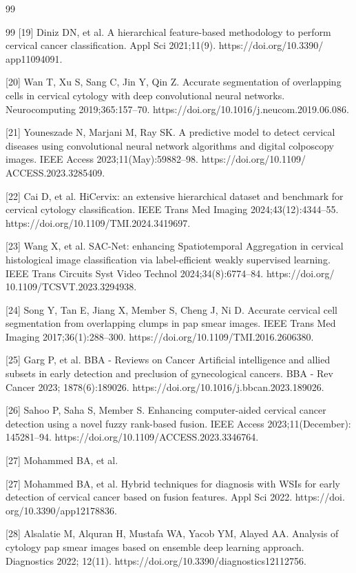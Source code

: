 \documentclass{svjour3}
\begin{document}
\begin{thebibliography}{99}
\begin{thebibliography}{99}
 [19] Diniz DN, et al. A hierarchical feature-based methodology to perform cervical cancer classification. Appl Sci 2021;11(9). https://doi.org/10.3390/ app11094091.

 [20] Wan T, Xu S, Sang C, Jin Y, Qin Z. Accurate segmentation of overlapping cells in cervical cytology with deep convolutional neural networks. Neurocomputing 2019;365:157–70. https://doi.org/10.1016/j.neucom.2019.06.086.

 [21] Youneszade N, Marjani M, Ray SK. A predictive model to detect cervical diseases using convolutional neural network algorithms and digital colposcopy images. IEEE Access 2023;11(May):59882–98. https://doi.org/10.1109/ ACCESS.2023.3285409.

 [22] Cai D, et al. HiCervix: an extensive hierarchical dataset and benchmark for cervical cytology classification. IEEE Trans Med Imaging 2024;43(12):4344–55. https://doi.org/10.1109/TMI.2024.3419697.

 [23] Wang X, et al. SAC-Net: enhancing Spatiotemporal Aggregation in cervical histological image classification via label-efficient weakly supervised learning. IEEE Trans Circuits Syst Video Technol 2024;34(8):6774–84. https://doi.org/ 10.1109/TCSVT.2023.3294938.

 [24] Song Y, Tan E, Jiang X, Member S, Cheng J, Ni D. Accurate cervical cell segmentation from overlapping clumps in pap smear images. IEEE Trans Med Imaging 2017;36(1):288–300. https://doi.org/10.1109/TMI.2016.2606380.

 [25] Garg P, et al. BBA - Reviews on Cancer Artificial intelligence and allied subsets in early detection and preclusion of gynecological cancers. BBA - Rev Cancer 2023; 1878(6):189026. https://doi.org/10.1016/j.bbcan.2023.189026.

 [26] Sahoo P, Saha S, Member S. Enhancing computer-aided cervical cancer detection using a novel fuzzy rank-based fusion. IEEE Access 2023;11(December): 145281–94. https://doi.org/10.1109/ACCESS.2023.3346764.

 [27] Mohammed BA, et al.

 [27] Mohammed BA, et al. Hybrid techniques for diagnosis with WSIs for early detection of cervical cancer based on fusion features. Appl Sci 2022. https://doi. org/10.3390/app12178836.

 [28] Alsalatie M, Alquran H, Mustafa WA, Yacob YM, Alayed AA. Analysis of cytology pap smear images based on ensemble deep learning approach. Diagnostics 2022; 12(11). https://doi.org/10.3390/diagnostics12112756.


\end{thebibliography}
\end{thebibliography}
\end{document}

